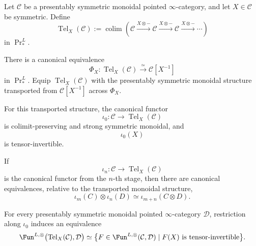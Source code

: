 \begin{theorem}
\label{thm:periodization-telescope}
Let \(\mathcal C\) be a presentably symmetric monoidal pointed
\(\infty\)-category, and let \(X\in\mathcal C\) be symmetric.  Define
\[
    \operatorname{Tel}_X(\mathcal C)
    :=
    \operatorname*{colim}
    \left(
      \mathcal C
      \xrightarrow{X\otimes-}
      \mathcal C
      \xrightarrow{X\otimes-}
      \mathcal C
      \xrightarrow{X\otimes-}
      \cdots
    \right)
\]
in \(\Pr^L_*\).

There is a canonical equivalence
\[
    \Phi_X:
    \operatorname{Tel}_X(\mathcal C)
    \xrightarrow{\simeq}
    \mathcal C[X^{-1}]
\]
in \(\Pr^L_*\).  Equip
\(\operatorname{Tel}_X(\mathcal C)\) with the presentably symmetric
monoidal structure transported from \(\mathcal C[X^{-1}]\) across
\(\Phi_X\).

For this transported structure, the canonical functor
\[
    \iota_0:
    \mathcal C
    \longrightarrow
    \operatorname{Tel}_X(\mathcal C)
\]
is colimit-preserving and strong symmetric monoidal, and
\[
    \iota_0(X)
\]
is tensor-invertible.

If
\[
    \iota_n:
    \mathcal C
    \longrightarrow
    \operatorname{Tel}_X(\mathcal C)
\]
is the canonical functor from the \(n\)-th stage, then there are canonical
equivalences, relative to the transported monoidal structure,
\[
    \iota_m(C)\otimes\iota_n(D)
    \simeq
    \iota_{m+n}(C\otimes D).
\]

For every presentably symmetric monoidal pointed \(\infty\)-category
\(\mathcal D\), restriction along \(\iota_0\) induces an equivalence
\[
\begin{aligned}
    \Fun^{L,\otimes}
    \bigl(
      \operatorname{Tel}_X(\mathcal C),
      \mathcal D
    \bigr)
    \simeq
    \bigl\{
      F\in
      \Fun^{L,\otimes}(\mathcal C,\mathcal D)
      \mid
      F(X)\text{ is tensor-invertible}
    \bigr\}.
\end{aligned}
\]
\end{theorem}

